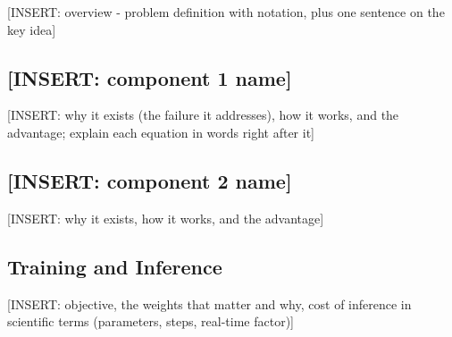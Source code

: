 [INSERT: overview - problem definition with notation, plus one sentence on the key idea]

\subsection{[INSERT: component 1 name]}
[INSERT: why it exists (the failure it addresses), how it works, and the advantage; explain each equation in words right after it]

\subsection{[INSERT: component 2 name]}
[INSERT: why it exists, how it works, and the advantage]

\subsection{Training and Inference}
[INSERT: objective, the weights that matter and why, cost of inference in scientific terms (parameters, steps, real-time factor)]
